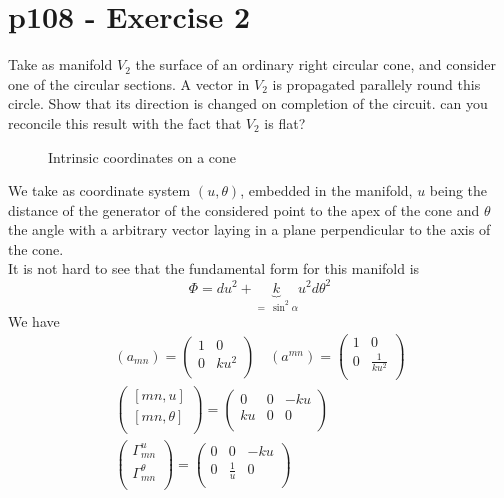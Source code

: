 \section{p108 - Exercise 2}
\begin{tcolorbox}
Take as manifold $V_2$ the surface of an ordinary right circular cone, and consider one of the circular sections. A vector in $V_2$ is propagated parallely round this circle. Show that its direction is changed on completion of the circuit. can you reconcile this result with the fact that $V_2$ is flat?
\end{tcolorbox}
\begin{figure}[h]
\center

\caption{Intrinsic coordinates on  a cone}
\label{fig:fig_p108_Ex2_a}
\end{figure}
We take as coordinate system $\left(u,\theta \right)$, embedded in the manifold, $u$ being the distance of the generator of the considered point to the apex of the cone and $\theta$ the angle with a arbitrary vector laying in a plane perpendicular to the axis of the cone.\\
It is not hard to see that the fundamental form for this manifold is $$ \Phi = du^2+ \underbrace{k}_{= \ \sin^2 \alpha}u^2 d\theta^2 $$ 
We have 
\begin{align}
 (a_{mn})= \begin{pmatrix}
 1&0  \\
 0& k u^2 \\
\end{pmatrix}\quad
 (a^{mn})= \begin{pmatrix}
 1&0  \\
 0& \frac{1}{k u^2} \\
\end{pmatrix}\\
 \begin{pmatrix}
 \left[ mn,u \right] \\
 \left[ mn,\theta \right] \\
\end{pmatrix}=\begin{pmatrix}
 0&0&-k u \\
 k u&0&0 \\
\end{pmatrix}\\
 \begin{pmatrix}
 \Gamma^u_{mn} \\
 \Gamma^{\theta}_{mn} \\
\end{pmatrix}=\begin{pmatrix}
 0&0&-k u \\
 0&\frac{1}{u}&0 \\
\end{pmatrix}
\end{align}

